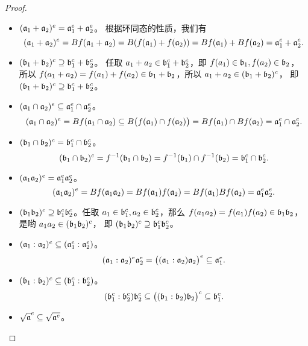 \begin{proof}
  \begin{itemize}[nosep]
    \item $(\mathfrak{a}_1+\mathfrak{a}_2)^e=\mathfrak{a}_1^e+\mathfrak{a}_2^e $。
    根据环同态的性质，我们有
    \[
      (\mathfrak{a}_1+\mathfrak{a}_2)^e=Bf(\mathfrak{a}_1+\mathfrak{a}_2)
      =B(f(\mathfrak{a}_1)+f(\mathfrak{a}_2))
      =Bf(\mathfrak{a}_1)+Bf(\mathfrak{a}_2)=
      \mathfrak{a}_1^e+\mathfrak{a}_2^e.
    \]
    \item $(\mathfrak{b}_1+\mathfrak{b}_2)^c\supseteq \mathfrak{b}_1^c+\mathfrak{b}_2^c$。
    任取 $a_1+a_2\in \mathfrak{b}_1^c+\mathfrak{b}_2^c$，即 $f(a_1)\in\mathfrak{b}_1,f(a_2)\in\mathfrak{b}_2$，
    所以 $f(a_1+a_2)=f(a_1)+f(a_2)\in \mathfrak{b}_1+\mathfrak{b}_2$，所以
    $a_1+a_2\in (\mathfrak{b}_1+\mathfrak{b}_2)^c$，
    即 $(\mathfrak{b}_1+\mathfrak{b}_2)^c\supseteq \mathfrak{b}_1^c+\mathfrak{b}_2^c$。
    \item $(\mathfrak{a}_1\cap\mathfrak{a}_2)^e\subseteq\mathfrak{a}_1^e\cap\mathfrak{a}_2^e$。
    \[
      (\mathfrak{a}_1\cap\mathfrak{a}_2)^e=Bf(\mathfrak{a}_1\cap\mathfrak{a}_2)
      \subseteq B\bigl(f(\mathfrak{a}_1)\cap f(\mathfrak{a}_2)\bigr)
      =Bf(\mathfrak{a}_1)\cap Bf(\mathfrak{a}_2)=\mathfrak{a}_1^e\cap\mathfrak{a}_2^e.
    \]
    \item $(\mathfrak{b}_1\cap\mathfrak{b}_2)^c=\mathfrak{b}_1^c\cap\mathfrak{b}_2^c$。
    \[
      (\mathfrak{b}_1\cap\mathfrak{b}_2)^c=f^{-1}(\mathfrak{b}_1\cap\mathfrak{b}_2)
      =f^{-1}(\mathfrak{b}_1)\cap f^{-1}(\mathfrak{b}_2)=  \mathfrak{b}_1^c\cap\mathfrak{b}_2^c.
    \]
    \item $(\mathfrak{a}_1\mathfrak{a}_2)^e=\mathfrak{a}_1^e\mathfrak{a}_2^e$。
    \[ 
      (\mathfrak{a}_1\mathfrak{a}_2)^e=Bf(\mathfrak{a}_1\mathfrak{a}_2)
      =Bf(\mathfrak{a}_1)f(\mathfrak{a}_2)
      =Bf(\mathfrak{a}_1)Bf(\mathfrak{a}_2)=\mathfrak{a}_1^e\mathfrak{a}_2^e.
    \]
    \item $(\mathfrak{b}_1\mathfrak{b}_2)^c\supseteq\mathfrak{b}_1^c\mathfrak{b}_2^c$。任取
    $a_1\in\mathfrak{b}_1^c,a_2\in\mathfrak{b}_2^c$，那么
    $f(a_1a_2)=f(a_1)f(a_2)\in\mathfrak{b}_1\mathfrak{b}_2$，是哟
    $a_1a_2\in (\mathfrak{b}_1\mathfrak{b}_2)^c$，
    即 $(\mathfrak{b}_1\mathfrak{b}_2)^c\supseteq\mathfrak{b}_1^c\mathfrak{b}_2^c$。
    \item $(\mathfrak{a}_1:\mathfrak{a}_2)^e\subseteq(\mathfrak{a}_1^e:\mathfrak{a}_2^e)$。
    \[
      (\mathfrak{a}_1:\mathfrak{a}_2)^e\mathfrak{a}_2^e=\bigl((\mathfrak{a}_1:\mathfrak{a}_2)\mathfrak{a}_2\bigr)^e
      \subseteq \mathfrak{a}_1^e.
    \]
    \item $(\mathfrak{b}_1:\mathfrak{b}_2)^c\subseteq (\mathfrak{b}_1^c:\mathfrak{b}_2^c)$。
    \[
      (\mathfrak{b}_1^c:\mathfrak{b}_2^c)\mathfrak{b}_2^c
      \subseteq \bigl((\mathfrak{b}_1:\mathfrak{b}_2)\mathfrak{b}_2\bigr)^c
      \subseteq\mathfrak{b}_1^c.
    \]
    \item $\sqrt{\mathfrak{a}}^e\subseteq\sqrt{\mathfrak{a}^e}$。

\end{itemize}
\end{proof}
